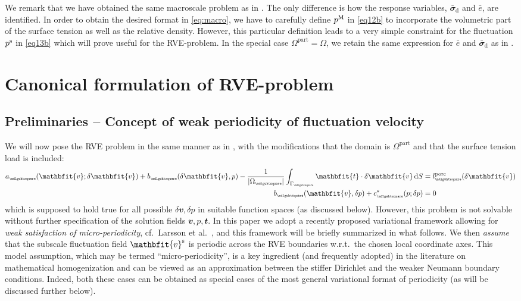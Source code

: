 \documentclass[12pt,a4paper]{article}
\renewcommand{\ta}[1]{\mathbfit{#1}}
\renewcommand{\ts}[1]{\mathbfit{#1}}
\renewcommand{\Box}{\mdlgwhtsquare}
\renewcommand{\dev}{\mathrm{d}}
\newcommand{\volume}{|\Omega_\rve|}
\newcommand{\pore}{\mathrm{pore}}
\newcommand{\particle}{\mathrm{part}}
\newcommand{\rve}{
  {\mathchoice
   {\mbox{\scalebox{0.67}{$\Box$}}}
   {\mbox{\scalebox{0.67}{$\Box$}}}
   {\mbox{\scalebox{0.5}{$\Box$}}}
   {\mbox{\scalebox{0.375}{$\Box$}}}
  }
}
\begin{document}
We remark that we have obtained the same macroscale problem as in \cite{ohman_variationally_2014}.
The only difference is how the response variables, $\bar{\ts\sigma}_\dev$ and $\bar{e}$, are identified.
In order to obtain the desired format in \eqref{eq:macro}, we have to carefully define $p^{\mathrm{M}}$ in \eqref{eq12b} to incorporate the volumetric part of the surface tension as well as the relative density. However, this particular definition leads to a very simple constraint for the fluctuation $p^{\mathrm{s}}$ in \eqref{eq13b} which will prove useful for the RVE-problem.
In the special case $\Omega^\particle = \Omega$, we retain the same expression for $\bar{e}$ and $\bar{\ts\sigma}_\dev$ as in \cite{ohman_variationally_2014}.



\section{Canonical formulation of RVE-problem}

\subsection{Preliminaries -- Concept of weak periodicity of fluctuation velocity}

We will now pose the RVE problem in the same manner as in \cite{ohman_variationally_2014}, with the modifications that the domain is $\Omega^\particle$ and that the surface tension load is included:
\begin{subequations}
\begin{align}
    a_\rve(\ta v;\delta\ta v) + b_\rve(\delta\ta v,p) - \frac{1}{\volume}\int_{\Gamma_\rve} \ta{t}\cdot\delta\ta v \dif S &= l_\rve^\pore(\delta\ta v)
\label{eq19a} \\
    b_\rve(\ta v,\delta p) + c^*_\rve(p;\delta p) &= 0
\label{eq19b}
\end{align}
\end{subequations}
which is supposed to hold true for all possible $\delta\ta v, \delta p$ in suitable function spaces (as discussed below).
However, this problem is not solvable without further specification of the solution fields $\ta v, p, \ta{t}$.
In this paper we adopt a recently proposed variational framework allowing for \emph{weak satisfaction of micro-periodicity}, cf.\  Larsson et al.\ \cite{larsson_computational_2011}, and this framework will be briefly summarized in what follows.
We then \emph{assume} that the subscale fluctuation field $\ta v^\fluct$ is periodic across the RVE boundaries w.r.t.\ the chosen local coordinate axes.
This model assumption, which may be termed ``micro-periodicity'', is a key ingredient (and frequently adopted) in the literature on mathematical homogenization and can be viewed as an approximation between the stiffer Dirichlet and the weaker Neumann boundary conditions.
Indeed, both these cases can be obtained as special cases of the most general variational format of periodicity (as will be discussed further below).
\end{document}
